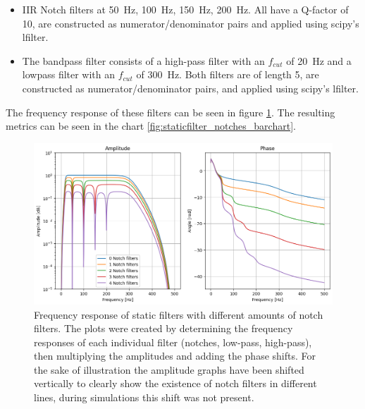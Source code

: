 \begin{itemize}
    \item IIR Notch filters at \SI{50}{Hz}, \SI{100}{Hz}, \SI{150}{Hz}, \SI{200}{Hz}. All have a Q-factor of 10, are constructed as numerator/denominator pairs and applied using scipy's lfilter.
    \item The bandpass filter consists of a high-pass filter with an $f_{cut}$ of \SI{20}{Hz} and a lowpass filter with an $f_{cut}$ of \SI{300}{Hz}. Both filters are of length 5, are constructed as numerator/denominator pairs, and applied using scipy's lfilter.
\end{itemize}

The frequency response of these filters can be seen in figure \ref{fig:staticfilter_notches_frequencyresponse}. The resulting metrics can be seen in the chart \ref{fig:staticfilter_notches_barchart}.

\begin{figure}[h!t]
	\begin{center}
		\includegraphics[width=1.0\columnwidth]{images/staticfilter_notches_frequencyresponse.png}
	\end{center}
	\caption{Frequency response of static filters with different amounts of notch filters. The plots were created by determining the frequency responses of each individual filter (notches, low-pass, high-pass), then multiplying the amplitudes and adding the phase shifts. For the sake of illustration the amplitude graphs have been shifted vertically to clearly show the existence of notch filters in different lines, during simulations this shift was not present. }
	\label{fig:staticfilter_notches_frequencyresponse}
\end{figure}

